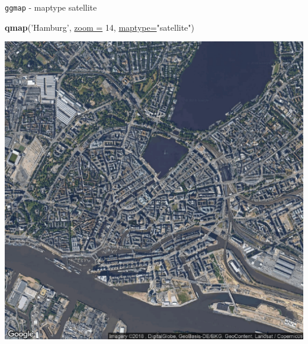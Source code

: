 \documentclass[ignorenonframetext,]{beamer}
\newenvironment{Shaded}{\begin{snugshade}}{\end{snugshade}}
\newcommand{\DataTypeTok}[1]{\textcolor[rgb]{0.74,0.68,0.62}{\underline{#1}}}
\newcommand{\DecValTok}[1]{\textcolor[rgb]{0.27,0.67,0.26}{#1}}
\newcommand{\KeywordTok}[1]{\textcolor[rgb]{0.26,0.66,0.93}{\textbf{#1}}}
\newcommand{\NormalTok}[1]{\textcolor[rgb]{0.74,0.68,0.62}{#1}}
\newcommand{\StringTok}[1]{\textcolor[rgb]{0.02,0.61,0.04}{#1}}
\begin{document}
\begin{frame}[fragile]{\texttt{ggmap} - maptype satellite}
\protect\hypertarget{ggmap---maptype-satellite}{}

\begin{Shaded}
\begin{Highlighting}[]
\KeywordTok{qmap}\NormalTok{(}\StringTok{'Hamburg'}\NormalTok{, }\DataTypeTok{zoom =} \DecValTok{14}\NormalTok{, }\DataTypeTok{maptype=}\StringTok{"satellite"}\NormalTok{)}
\end{Highlighting}
\end{Shaded}

\includegraphics{figure/ham_map_sat.pdf}

\end{frame}
\end{document}
